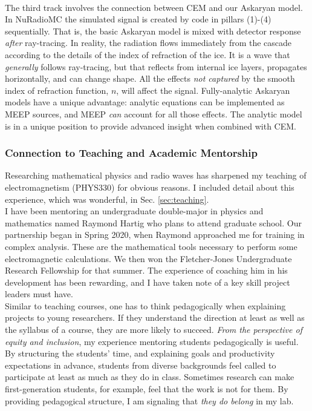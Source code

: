 \documentclass[../../../main.tex]{subfiles}
\begin{document}
\\
\vspace{0.15cm}
The third track involves the connection between CEM and our Askaryan model.  In NuRadioMC the simulated signal is created by code in pillars (1)-(4) sequentially.  That is, the basic Askaryan model is mixed with detector response \textit{after} ray-tracing.  In reality, the radiation flows immediately from the cascade according to the details of the index of refraction of the ice.  It is a wave that \textit{generally} follows ray-tracing, but that reflects from internal ice layers, propagates horizontally, and can change shape.  All the effects \textit{not captured} by the smooth index of refraction function, $n$, will affect the signal.  Fully-analytic Askaryan models have a unique advantage: analytic equations can be implemented as MEEP sources, and MEEP \textit{can} account for all those effects.  The analytic model is in a unique position to provide advanced insight when combined with CEM.

\subsubsection{Connection to Teaching and Academic Mentorship}

Researching mathematical physics and radio waves has sharpened my teaching of electromagnetism (PHYS330) for obvious reasons.  I included detail about this experience, which was wonderful, in Sec. \ref{sec:teaching}.
\\
\vspace{0.15cm}
I have been mentoring an undergraduate double-major in physics and mathematics named Raymond Hartig who plans to attend graduate school.  Our partnership began in Spring 2020, when Raymond approached me for training in complex analysis.  These are the mathematical tools necessary to perform some electromagnetic calculations.  We then won the Fletcher-Jones Undergraduate Research Fellowship for that summer.  The experience of coaching him in his development has been rewarding, and I have taken note of a key skill project leaders must have.
\\
\vspace{0.15cm}
Similar to teaching courses, one has to think pedagogically when explaining projects to young researchers.  If they understand the direction at least as well as the syllabus of a course, they are more likely to succeed.  \textit{From the perspective of equity and inclusion}, my experience mentoring students pedagogically is useful.  By structuring the students' time, and explaining goals and productivity expectations in advance, students from diverse backgrounds feel called to participate at least as much as they do in class.  Sometimes research can make first-generation students, for example, feel that the work is not for them.  By providing pedagogical structure, I am signaling that \textit{they do belong} in my lab.
\end{document}
